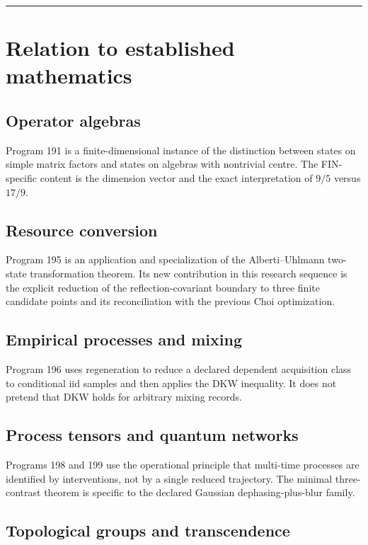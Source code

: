 \documentclass[11pt,a4paper,openany]{report}
\begin{document}
\par\medskip\hrule\medskip

\chapter{Relation to established mathematics}

\section{Operator algebras}

Program 191 is a finite-dimensional instance of the distinction between states on simple matrix factors and states on algebras with nontrivial centre. The FIN-specific content is the dimension vector and the exact interpretation of \(9/5\) versus \(17/9\).

\section{Resource conversion}

Program 195 is an application and specialization of the Alberti--Uhlmann two-state transformation theorem. Its new contribution in this research sequence is the explicit reduction of the reflection-covariant boundary to three finite candidate points and its reconciliation with the previous Choi optimization.

\section{Empirical processes and mixing}

Program 196 uses regeneration to reduce a declared dependent acquisition class to conditional iid samples and then applies the DKW inequality. It does not pretend that DKW holds for arbitrary mixing records.

\section{Process tensors and quantum networks}

Programs 198 and 199 use the operational principle that multi-time processes are identified by interventions, not by a single reduced trajectory. The minimal three-contrast theorem is specific to the declared Gaussian dephasing-plus-blur family.

\section{Topological groups and transcendence}
\end{document}
